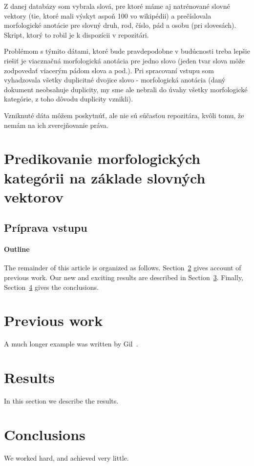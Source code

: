 \documentclass[12pt]{article}
\begin{document}
Z danej databázy som vybrala slová, pre ktoré máme aj natrénované slovné vektory (tie, ktoré mali výskyt aspoň 100 vo wikipédii) a prečíslovala morfologické anotácie pre slovný druh, rod, číslo, pád a osobu (pri slovesách). Skript, ktorý to robil je k dispozícii v repozitári.  

Problémom s týmito dátami, ktoré bude pravdepodobne v budúcnosti treba lepšie riešiť je viacznačná morfologická anotácia pre jedno slovo (jeden tvar slova môže zodpovedať viacerým pádom slova a pod.). Pri spracovaní vstupu som vyhadzovala všetky duplicitné dvojice slovo - morfologická anotácia (daný dokument neobsahuje duplicity, my sme ale nebrali do úvahy všetky morfologické kategórie, z toho dôvodu duplicity vznikli). 

Vzniknuté dáta môžem poskytnúť, ale nie sú súčasťou repozitára, kvôli tomu, že nemám na ich zverejňovanie práva. 

\section{Predikovanie morfologických kategórii na základe slovných vektorov}
\subsection{Príprava vstupu}




\paragraph{Outline}
The remainder of this article is organized as follows.
Section~\ref{previous work} gives account of previous work.
Our new and exciting results are described in Section~\ref{results}.
Finally, Section~\ref{conclusions} gives the conclusions.

\section{Previous work}\label{previous work}
A much longer \LaTeXe{} example was written by Gil~\cite{Gil:02}.

\section{Results}\label{results}
In this section we describe the results.

\section{Conclusions}\label{conclusions}
We worked hard, and achieved very little.



\end{document}

